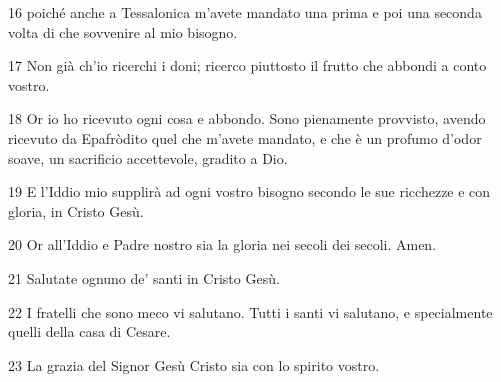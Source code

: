 \par 16 poiché anche a Tessalonica m'avete mandato una prima e poi una seconda volta di che sovvenire al mio bisogno.
\par 17 Non già ch'io ricerchi i doni; ricerco piuttosto il frutto che abbondi a conto vostro.
\par 18 Or io ho ricevuto ogni cosa e abbondo. Sono pienamente provvisto, avendo ricevuto da Epafròdito quel che m'avete mandato, e che è un profumo d'odor soave, un sacrificio accettevole, gradito a Dio.
\par 19 E l'Iddio mio supplirà ad ogni vostro bisogno secondo le sue ricchezze e con gloria, in Cristo Gesù.
\par 20 Or all'Iddio e Padre nostro sia la gloria nei secoli dei secoli. Amen.
\par 21 Salutate ognuno de' santi in Cristo Gesù.
\par 22 I fratelli che sono meco vi salutano. Tutti i santi vi salutano, e specialmente quelli della casa di Cesare.
\par 23 La grazia del Signor Gesù Cristo sia con lo spirito vostro.


